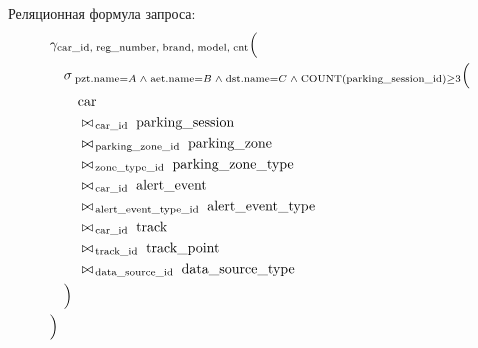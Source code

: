 \noindent Реляционная формула запроса:
\[
\begin{aligned}
&\gamma_{
  \text{car\_id},\;
  \text{reg\_number},\;
  \text{brand},\;
  \text{model},\;
  \text{cnt}
}\Bigl( \\
&\quad\sigma_{
  \;\text{pzt.name}=A
  \;\wedge\;
  \text{aet.name}=B
  \;\wedge\;
  \text{dst.name}=C
  \;\wedge\;
  \text{COUNT}(\text{parking\_session\_id}) \ge 3
}\Bigl( \\
&\qquad\text{car} \\
&\qquad\bowtie_{\,\text{car\_id}}\;\text{parking\_session} \\
&\qquad\bowtie_{\,\text{parking\_zone\_id}}\;\text{parking\_zone} \\
&\qquad\bowtie_{\,\text{zone\_type\_id}}\;\text{parking\_zone\_type} \\
&\qquad\bowtie_{\,\text{car\_id}}\;\text{alert\_event} \\
&\qquad\bowtie_{\,\text{alert\_event\_type\_id}}\;\text{alert\_event\_type} \\
&\qquad\bowtie_{\,\text{car\_id}}\;\text{track} \\
&\qquad\bowtie_{\,\text{track\_id}}\;\text{track\_point} \\
&\qquad\bowtie_{\,\text{data\_source\_id}}\;\text{data\_source\_type} \\
&\quad\Bigr) \\
&\Bigr)
\end{aligned}
\]

